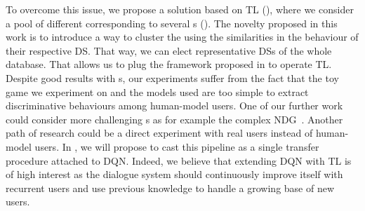 To overcome this issue, we propose a solution based on \acrfull{TL} (), where we consider a pool of different  corresponding to several s (). The novelty proposed in this work is to introduce a way to cluster the  using the similarities in the behaviour of their respective \gls{DS}. That way, we can elect representative \glspl{DS} of the whole database. That allows us to plug the  framework proposed in \textcite{Genevay2016} to operate  \gls{TL}. Despite good results with s, our experiments suffer from the fact that the toy game we experiment on and the models used are too simple to extract discriminative behaviours among human-model users. One of our further work could consider more challenging s as for example the complex \acrlong{NDG}~\parencite{laroche2017ndg}. Another path of research could be a direct experiment with real users instead of human-model users. In , we will propose to cast this pipeline as a single transfer procedure attached to \gls{DQN}. Indeed, we believe that extending \gls{DQN} with \gls{TL} is of high interest as the dialogue system should continuously improve itself with recurrent users and use previous knowledge to handle a growing base of new users.

